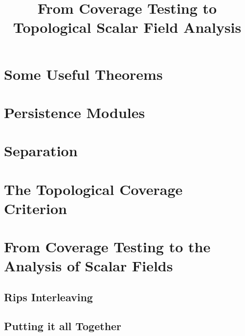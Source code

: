 \documentclass[12pt]{article}
\begin{document}
\title{From Coverage Testing to Topological Scalar Field Analysis}




\section{Some Useful Theorems}


\section{Persistence Modules}


\section{Separation}


\clearpage
\section{The Topological Coverage Criterion}


\clearpage
\section{From Coverage Testing to the Analysis of Scalar Fields}


\subsection{Rips Interleaving}


\subsection{Putting it all Together}


\appendix




\end{document}
